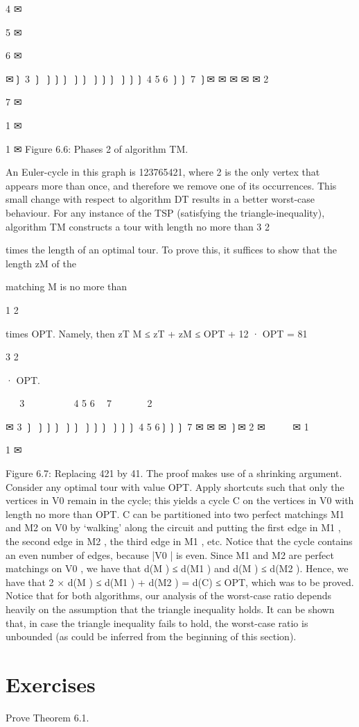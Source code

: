 4
✉

5
✉

6
✉

✉❳
3 ❳
❳❳❳
❳❳
❳❳❳
❳❳❳
4
5
6 ❳❳ 7
❳✉
✉
✉
✉
✉
2

7
✉

1 ✉

1 ✉
Figure 6.6: Phases 2 of algorithm TM.

An Euler-cycle in this graph is 123765421, where 2 is the only vertex that appears more than once, and
therefore we remove one of its occurrences.
This small change with respect to algorithm DT results in a better worst-case behaviour. For any instance
of the TSP (satisfying the triangle-inequality), algorithm TM constructs a tour with length no more than
3
2

times the length of an optimal tour. To prove this, it suffices to show that the length zM of the

matching M is no more than

1
2

times OPT. Namely, then zT M ≤ zT + zM ≤ OPT + 12 · OPT =
81

3
2

· OPT.

❳❳❳
3 ✉
❳❳
❳❳❳
❳❳
❳❳❳
4
5
6 ❳❳ 7
✉
✉
✉
✉
❳✉
2

✉
3 ❳
❳❳❳
❳❳
❳❳❳
❳❳❳
4
5
6❳❳❳ 7
✉
✉
✉
❳✉
2 ✉
 
 
 
✉
1  

1 ✉

Figure 6.7: Replacing 421 by 41.
The proof makes use of a shrinking argument. Consider any optimal tour with value OPT. Apply
shortcuts such that only the vertices in V0 remain in the cycle; this yields a cycle C on the vertices in
V0 with length no more than OPT. C can be partitioned into two perfect matchings M1 and M2 on V0
by ‘walking' along the circuit and putting the first edge in M1 , the second edge in M2 , the third edge in
M1 , etc. Notice that the cycle contains an even number of edges, because |V0 | is even.
Since M1 and M2 are perfect matchings on V0 , we have that d(M ) ≤ d(M1 ) and d(M ) ≤ d(M2 ). Hence,
we have that 2 × d(M ) ≤ d(M1 ) + d(M2 ) = d(C) ≤ OPT, which was to be proved.
Notice that for both algorithms, our analysis of the worst-case ratio depends heavily on the assumption
that the triangle inequality holds. It can be shown that, in case the triangle inequality fails to hold, the
worst-case ratio is unbounded (as could be inferred from the beginning of this section).

\section*{Exercises}
\begin{exercise}
Prove Theorem 6.1.
\end{exercise}

